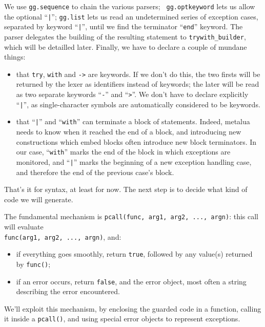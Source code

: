 We use {\tt gg.sequence} to chain the various parsers; {\tt
  gg.optkeyword} lets us allow the optional ``{\tt|}''; {\tt gg.list}
lets us read an undetermined series of exception cases, separated by
keyword ``{\tt|}'', until we find the terminator ``{\tt end}''
keyword. The parser delegates the building of the resulting statement
to {\tt trywith\_builder}, which will be detailled later. Finally, we
have to declare a couple of mundane things:
\begin{itemize}
\item that {\tt try}, {\tt with} and {\tt->} are keywords. If we don't
  do this, the two firsts will be returned by the lexer as identifiers
  instead of keywords; the later will be read as two separate keywords
  ``{\tt-}'' and ``{\tt>}''. We don't have to declare explicitly
  ``{\tt|}'', as single-character symbols are automatically considered to
  be keywords.
\item that ``{\tt|}'' and ``{\tt with}'' can terminate a block of
  statements. Indeed, metalua needs to know when it reached the end of
  a block, and introducing new constructions which embed blocks often
  introduce new block terminators. In our case, ``{\tt with}'' marks
  the end of the block in which exceptions are monitored, and ``{\tt|}''
  marks the beginning of a new exception handling case, and therefore
  the end of the previous case's block.
\end{itemize}

That's it for syntax, at least for now. The next step is to decide
what kind of code we will generate.

The fundamental mechanism is {\tt pcall(func, arg1, arg2, ...,
  argn)}: this call will evaluate\\
{\tt func(arg1, arg2, ..., argn)}, and:
\begin{itemize}
\item if everything goes smoothly, return {\tt true}, followed by any
  value(s) returned by {\tt func()};
\item if an error occurs, return {\tt false}, and the error object,
  most often a string describing the error encountered.
\end{itemize}

We'll exploit this mechanism, by enclosing the guarded code in a
function, calling it inside a {\tt pcall()}, and using special error
objects to represent exceptions.


